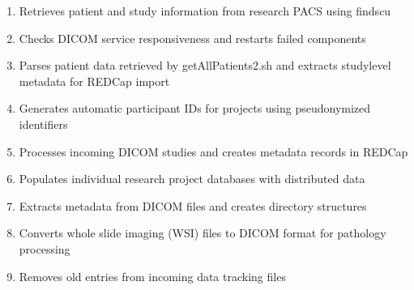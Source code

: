 \documentclass[letterpaper,10pt,english]{sphinxmanual}
\begin{document}
\begin{enumerate}
\item {} 
\sphinxAtStartPar
{\hyperref[\detokenize{Architecture/scripts/getAllPatients2::doc}]{}} \sphinxhyphen{} Retrieves patient and study information from research PACS using findscu

\item {} 
\sphinxAtStartPar
{\hyperref[\detokenize{Architecture/scripts/heartbeat::doc}]{}} \sphinxhyphen{} Checks DICOM service responsiveness and restarts failed components

\item {} 
\sphinxAtStartPar
{\hyperref[\detokenize{Architecture/scripts/parseAllPatients::doc}]{}} \sphinxhyphen{} Parses patient data retrieved by getAllPatients2.sh and extracts study\sphinxhyphen{}level metadata for REDCap import

\item {} 
\sphinxAtStartPar
{\hyperref[\detokenize{Architecture/scripts/populateAutoID::doc}]{}} \sphinxhyphen{}  Generates automatic participant IDs for projects using pseudonymized identifiers

\item {} 
\sphinxAtStartPar
{\hyperref[\detokenize{Architecture/scripts/populateIncoming::doc}]{}} \sphinxhyphen{} Processes incoming DICOM studies and creates metadata records in REDCap

\item {} 
\sphinxAtStartPar
{\hyperref[\detokenize{Architecture/scripts/populateProjects::doc}]{}} \sphinxhyphen{} Populates individual research project databases with distributed data

\item {} 
\sphinxAtStartPar
{\hyperref[\detokenize{Architecture/scripts/processSingleFile3::doc}]{}} \sphinxhyphen{} Extracts metadata from DICOM files and creates directory structures

\item {} 
\sphinxAtStartPar
{\hyperref[\detokenize{Architecture/scripts/process_tiff::doc}]{}} \sphinxhyphen{} Converts whole slide imaging (WSI) files to DICOM format for pathology processing

\item {} 
\sphinxAtStartPar
{\hyperref[\detokenize{Architecture/scripts/removeOldEntries::doc}]{}} \sphinxhyphen{} Removes old entries from incoming data tracking files


\end{enumerate}
\end{document}
